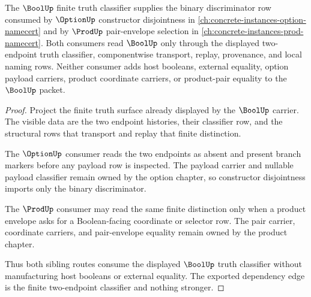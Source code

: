 \begin{theorem}
\label{thm:bool-option-prod-sibling-lattice-link}
The $\BoolUp$ finite truth classifier supplies the binary discriminator row consumed by $\OptionUp$ constructor disjointness in \autoref{ch:concrete-instances-option-namecert} and by $\ProdUp$ pair-envelope selection in \autoref{ch:concrete-instances-prod-namecert}. Both consumers read $\BoolUp$ only through the displayed two-endpoint truth classifier, componentwise transport, replay, provenance, and local naming rows. Neither consumer adds host booleans, external equality, option payload carriers, product coordinate carriers, or product-pair equality to the $\BoolUp$ packet.
\end{theorem}
\begin{proof}
Project the finite truth surface already displayed by the $\BoolUp$ carrier. The visible data are the two endpoint histories, their classifier row, and the structural rows that transport and replay that finite distinction.

The $\OptionUp$ consumer reads the two endpoints as absent and present branch markers before any payload row is inspected. The payload carrier and nullable payload classifier remain owned by the option chapter, so constructor disjointness imports only the binary discriminator.

The $\ProdUp$ consumer may read the same finite distinction only when a product envelope asks for a Boolean-facing coordinate or selector row. The pair carrier, coordinate carriers, and pair-envelope equality remain owned by the product chapter.

Thus both sibling routes consume the displayed $\BoolUp$ truth classifier without manufacturing host booleans or external equality. The exported dependency edge is the finite two-endpoint classifier and nothing stronger.
\end{proof}
